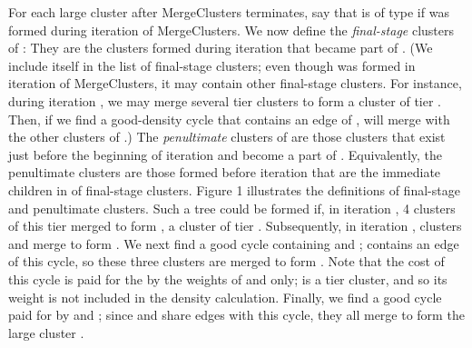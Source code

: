 \documentclass[11pt]{article}
\begin{document}
For each large cluster  after {\sc MergeClusters} terminates, say
that  is of type  if  was formed during iteration  of
MergeClusters. We now define the \emph{final-stage} clusters of :
They are the clusters formed during iteration  that became part of
. (We include  itself in the list of final-stage clusters; even
though  was formed in iteration  of {\sc MergeClusters}, it may
contain other final-stage clusters. For instance, during iteration
, we may merge several tier  clusters to form a cluster  of
tier . Then, if we find a good-density cycle  that contains
an edge of ,  will merge with the other clusters of .)  The
\emph{penultimate} clusters of  are those clusters that exist just
before the beginning of iteration  and become a part of
. Equivalently, the penultimate clusters are those formed before
iteration  that are the immediate children in  of final-stage
clusters. Figure 1 illustrates the definitions of final-stage and
penultimate clusters. Such a tree could be formed if, in iteration
, 4 clusters of this tier merged to form , a cluster of tier
. Subsequently, in iteration , clusters  and  merge to
form . We next find a good cycle containing  and ; 
contains an edge of this cycle, so these three clusters are merged to
form . Note that the cost of this cycle is paid for the by the
weights of  and  only;  is a tier  cluster, and so its
weight is not included in the density calculation. Finally, we find a
good cycle paid for by  and ; since  and  share edges with
this cycle, they all merge to form the large cluster .
\end{document}
